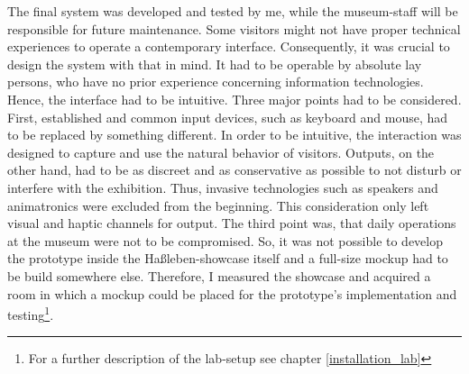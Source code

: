 The final system was developed and tested by me, while the museum-staff will be responsible for future maintenance. Some visitors might not have proper technical experiences to operate a contemporary interface. Consequently, it was crucial to design the system with that in mind. It had to be operable by absolute lay persons, who have no prior experience concerning information technologies. Hence, the interface had to be intuitive. Three major points had to be considered.
\\
First, established and common input devices, such as keyboard and mouse, had to be replaced by something different. In order to be intuitive, the interaction was designed to capture and use the natural behavior of visitors. Outputs, on the other hand, had to be as discreet and as conservative as possible to not disturb or interfere with the exhibition. Thus, invasive technologies such as speakers and animatronics were excluded from the beginning. This consideration only left visual and haptic channels for output. The third point was, that daily operations at the museum were not to be compromised. So, it was not possible to develop the prototype inside the Haßleben-showcase itself and a full-size mockup had to be build somewhere else. Therefore, I measured the showcase and acquired a room in which a mockup could be placed for the prototype's implementation and testing\footnote{For a further description of the lab-setup see chapter \ref{installation_lab}}.
\\


%

